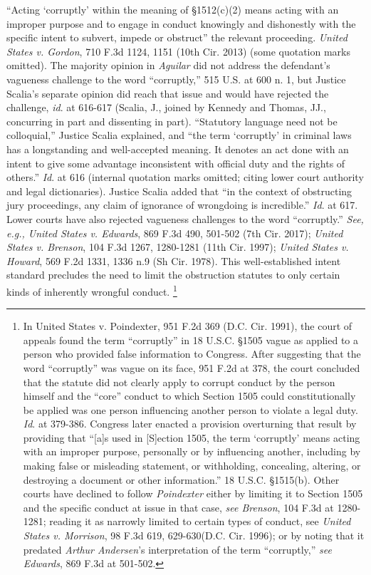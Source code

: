 “Acting ‘corruptly’ within the meaning of \S 1512(c)(2) means acting with an improper purpose and to engage in conduct knowingly and dishonestly with the specific intent to subvert, impede or obstruct” the relevant proceeding.
\textit{United States v. Gordon}, 710 F.3d 1124, 1151 (10th Cir. 2013) (some quotation marks omitted).
The majority opinion in \textit{Aguilar} did not address the defendant’s vagueness challenge to the word “corruptly,” 515 U.S. at 600 n. 1, but Justice Scalia’s separate opinion did reach that issue and would have rejected the challenge, \textit{id}. at 616-617 (Scalia, J., joined by Kennedy and Thomas, JJ., concurring in part and dissenting in part).
“Statutory language need not be colloquial,” Justice Scalia explained, and “the term ‘corruptly’ in criminal laws has a longstanding and well-accepted meaning.
It denotes an act done with an intent to give some advantage inconsistent with official duty and the rights of others.”
\textit{Id}. at 616 (internal quotation marks omitted; citing lower court authority and legal dictionaries).
Justice Scalia added that “in the context of obstructing jury proceedings, any claim of ignorance of wrongdoing is incredible.”
\textit{Id}. at 617.
Lower courts have also rejected vagueness challenges to the word “corruptly.”
\textit{See, e.g., United States v. Edwards}, 869 F.3d 490, 501-502 (7th Cir. 2017);
\textit{United States v. Brenson}, 104 F.3d 1267, 1280-1281 (11th Cir. 1997);
\textit{United States v. Howard}, 569 F.2d 1331, 1336 n.9 (Sh Cir. 1978).
This well-established intent standard precludes the need to limit the obstruction statutes to only certain kinds of inherently wrongful conduct.%
\footnote{In United States v. Poindexter, 951 F.2d 369 (D.C. Cir. 1991), the court of appeals found the term “corruptly” in 18 U.S.C. \S 1505 vague as applied to a person who provided false information to Congress.
After suggesting that the word “corruptly” was vague on its face, 951 F.2d at 378, the court concluded that the statute did not clearly apply to corrupt conduct by the person himself and the “core” conduct to which Section 1505 could constitutionally be applied was one person influencing another person to violate a legal duty.
\textit{Id}. at 379-386.
Congress later enacted a provision overturning that result by providing that “[a]s used in [S]ection 1505, the term ‘corruptly’ means acting with an improper purpose, personally or by influencing another, including by making false or misleading statement, or withholding, concealing, altering, or destroying a document or other information.”
18 U.S.C. \S 1515(b).
Other courts have declined to follow \textit{Poindexter} either by limiting it to Section 1505 and the specific conduct at issue in that case, \textit{see Brenson}, 104 F.3d at 1280-1281;
reading it as narrowly limited to certain types of conduct, see \textit{United States v. Morrison}, 98 F.3d 619, 629-630(D.C. Cir. 1996);
or by noting that it predated \textit{Arthur Andersen}’s interpretation of the term “corruptly,” \textit{see Edwards}, 869 F.3d at 501-502.
 }

